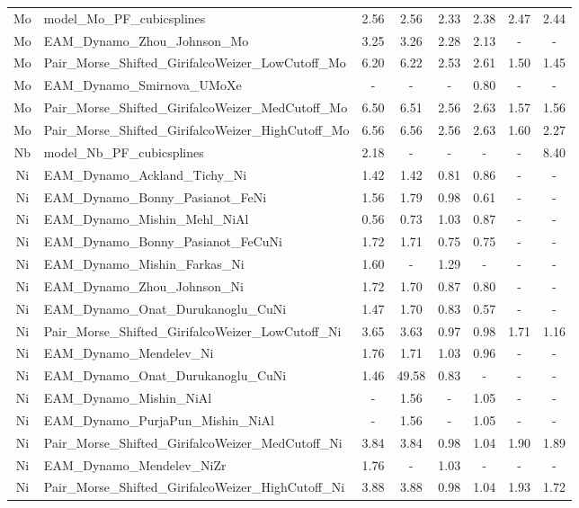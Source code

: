 \documentclass[%
 reprint,
 amsmath,amssymb,
 aps,
]{revtex4-1}
\begin{document}
\begin{longtable*}{@{\extracolsep{\fill}} c l c c c c c c}
 Mo & model\_Mo\_PF\_cubicsplines & 2.56 & 2.56 & 2.33 & 2.38 & 2.47 & 2.44 \\
 Mo & EAM\_Dynamo\_Zhou\_Johnson\_Mo & 3.25 & 3.26 & 2.28 & 2.13 & - & - \\
 Mo & Pair\_Morse\_Shifted\_GirifalcoWeizer\_LowCutoff\_Mo & 6.20 & 6.22 & 2.53 & 2.61 & 1.50 & 1.45 \\
 Mo & EAM\_Dynamo\_Smirnova\_UMoXe & - & - & - & 0.80 & - & - \\
 Mo & Pair\_Morse\_Shifted\_GirifalcoWeizer\_MedCutoff\_Mo & 6.50 & 6.51 & 2.56 & 2.63 & 1.57 & 1.56 \\
 Mo & Pair\_Morse\_Shifted\_GirifalcoWeizer\_HighCutoff\_Mo & 6.56 & 6.56 & 2.56 & 2.63 & 1.60 & 2.27 \\
 Nb & model\_Nb\_PF\_cubicsplines & 2.18 & - & - & - & - & 8.40 \\
 Ni & EAM\_Dynamo\_Ackland\_Tichy\_Ni & 1.42 & 1.42 & 0.81 & 0.86 & - & - \\
 Ni & EAM\_Dynamo\_Bonny\_Pasianot\_FeNi & 1.56 & 1.79 & 0.98 & 0.61 & - & - \\
 Ni & EAM\_Dynamo\_Mishin\_Mehl\_NiAl & 0.56 & 0.73 & 1.03 & 0.87 & - & - \\
 Ni & EAM\_Dynamo\_Bonny\_Pasianot\_FeCuNi & 1.72 & 1.71 & 0.75 & 0.75 & - & - \\
 Ni & EAM\_Dynamo\_Mishin\_Farkas\_Ni & 1.60 & - & 1.29 & - & - & - \\
 Ni & EAM\_Dynamo\_Zhou\_Johnson\_Ni & 1.72 & 1.70 & 0.87 & 0.80 & - & - \\
 Ni & EAM\_Dynamo\_Onat\_Durukanoglu\_CuNi & 1.47 & 1.70 & 0.83 & 0.57 & - & - \\
 Ni & Pair\_Morse\_Shifted\_GirifalcoWeizer\_LowCutoff\_Ni & 3.65 & 3.63 & 0.97 & 0.98 & 1.71 & 1.16 \\
 Ni & EAM\_Dynamo\_Mendelev\_Ni & 1.76 & 1.71 & 1.03 & 0.96 & - & - \\
 Ni & EAM\_Dynamo\_Onat\_Durukanoglu\_CuNi & 1.46 & 49.58 & 0.83 & - & - & - \\
 Ni & EAM\_Dynamo\_Mishin\_NiAl & - & 1.56 & - & 1.05 & - & - \\
 Ni & EAM\_Dynamo\_PurjaPun\_Mishin\_NiAl & - & 1.56 & - & 1.05 & - & - \\
 Ni & Pair\_Morse\_Shifted\_GirifalcoWeizer\_MedCutoff\_Ni & 3.84 & 3.84 & 0.98 & 1.04 & 1.90 & 1.89 \\
 Ni & EAM\_Dynamo\_Mendelev\_NiZr & 1.76 & - & 1.03 & - & - & - \\
 Ni & Pair\_Morse\_Shifted\_GirifalcoWeizer\_HighCutoff\_Ni & 3.88 & 3.88 & 0.98 & 1.04 & 1.93 & 1.72 \\

\end{longtable*}
\end{document}
